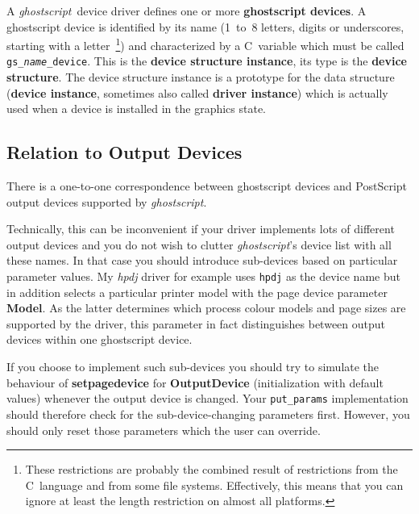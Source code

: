 \documentclass[twoside,a4paper]{article}
\newcommand{\gs}{\textit{ghostscript\/}}
\newcommand{\ps}[1]{{\sffamily\bfseries #1}}	%
\renewcommand{\d}[1]{{\bfseries #1}}	%
\newcommand{\prog}[1]{\texttt{#1}}
\newif\ifdraft \draftfalse
\begin{document}
A \gs\ device driver defines one or more \d{ghostscript devices}.
A ghostscript device is identified by its name (1~to~8 letters, digits or
underscores, starting with a letter~\cite{Drivers5.50}\footnote{%
  These restrictions are probably the combined result of restrictions from
  the C~language and from some file systems.
  Effectively, this means that you can ignore at least the length restriction
  on almost all platforms.}) and characterized by a
C~variable which must be called {\tt gs\_\textit{name}\_device}.
This is the \d{device structure instance},
its type is the \d{device structure}.
The device structure instance is a prototype for the data structure
(\d{device instance}, sometimes also called \d{driver instance})
which is actually used when a device is installed in the graphics state.

\ifdraft
??? Forwarding device, band device,
life cycle (at which point in a multi-function open call is the device open?
Will partially opened devices be closed?)
\fi


\subsection{Relation to Output Devices}

There is a one-to-one correspondence between ghostscript devices and 
PostScript output devices supported by \gs.

Technically, this can be inconvenient if your driver implements lots of
different output devices and you do not wish to clutter \gs's device list
with all these names.
In that case you should introduce sub-devices based on particular parameter
values.
My \textit{hpdj\/} driver for example uses \texttt{hpdj} as the device name but
in addition selects a particular printer model with the
page device parameter \ps{Model}.
As the latter determines which process colour models and page sizes are
supported by the driver,
this parameter in fact distinguishes between output devices within one
ghostscript device.

If you choose to implement such sub-devices you should try to simulate the
behaviour of \ps{setpagedevice} for \ps{OutputDevice}
(initialization with default values)
whenever the output device is changed.
Your \prog{put\_params} implementation should therefore check for the
sub-device-changing parameters first.
However, you should only reset those parameters which the user can override.
\end{document}
